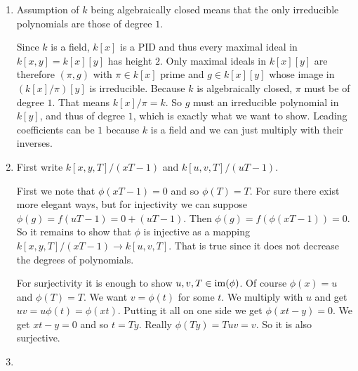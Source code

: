 \begin{exercise}{2}
    \begin{enumerate}
        \item Assumption of $k$ being algebraically closed means that the only
            irreducible polynomials are those of degree $1$.

            Since $k$ is a field, $k[x]$ is a PID and thus every maximal ideal
            in $k[x, y] = k[x][y]$ has height $2$. Only maximal ideals in
            $k[x][y]$ are therefore $(\pi, g)$ with $\pi \in k[x]$ prime and $g
            \in k[x][y]$ whose image in $(k[x]/\pi)[y]$ is irreducible. Because
            $k$ is algebraically closed, $\pi$ must be of degree $1$. That means
            $k[x]/\pi = k$. So $g$ must an irreducible polynomial in $k[y]$, and
            thus of degree $1$, which is exactly what we want to show. Leading
            coefficients can be $1$ because $k$ is a field and we can just
            multiply with their inverses.
        \item First write $k[x, y, T]/(xT - 1)$ and $k[u, v, T]/(uT - 1)$.

            First we note that $\phi(xT - 1) = 0$ and so $\phi(T) = T$.
            For sure there exist more elegant ways, but for injectivity we can
            suppose $\phi(g) = f (uT - 1) = 0 + (uT - 1)$. Then $\phi(g) = f
            (\phi(xT - 1)) = 0$. So it remains to show that $\phi$ is injective
            as a mapping $k[x, y, T]/(xT - 1) \rightarrow k[u, v, T]$. That is
            true since it does not decrease the degrees of polynomials.

            For surjectivity it is enough to show $u, v, T \in \operatorname{im}(\phi)$.
            Of course $\phi(x) = u$ and $\phi(T) = T$. We want $v = \phi(t)$ for
            some $t$. We multiply with $u$ and get $uv = u \phi(t) = \phi(xt)$.
            Putting it all on one side we get $\phi(xt - y) = 0$. We get $xt - y
            = 0$ and so $t = Ty$. Really $\phi(Ty) = Tuv = v$. So it is also
            surjective.

        \item 
    \end{enumerate}
\end{exercise}

